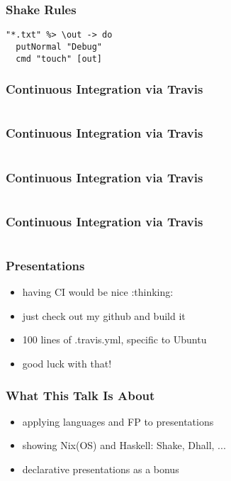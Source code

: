 \documentclass{beamer}
\begin{document}
\begin{frame}[fragile]
  \frametitle{Shake Rules}
  \begin{verbatim}
"*.txt" %> \out -> do
  putNormal "Debug"
  cmd "touch" [out]
  \end{verbatim}
\end{frame}

\begin{frame}
  \frametitle{Continuous Integration via Travis}
  \inputminted[linenos=false, fontsize=\tiny, lastline=31]{yaml}{static-source/long-travis-ci.yml}
\end{frame}

\begin{frame}
  \frametitle{Continuous Integration via Travis}
  \inputminted[linenos=false, fontsize=\tiny, firstline=31, lastline=60]{yaml}{static-source/long-travis-ci.yml}
\end{frame}

\begin{frame}
  \frametitle{Continuous Integration via Travis}
  \inputminted[linenos=false, fontsize=\tiny, firstline=61, lastline=90]{yaml}{static-source/long-travis-ci.yml}
\end{frame}

\begin{frame}
  \frametitle{Continuous Integration via Travis}
  \inputminted[linenos=false, fontsize=\tiny, firstline=91, lastline=120]{yaml}{static-source/long-travis-ci.yml}
\end{frame}

\begin{frame}
  \frametitle{Presentations}
  \begin{itemize}
  \item having CI would be nice :thinking:
  \item just check out my github and build it
  \item 100 lines of .travis.yml, specific to Ubuntu
  \item good luck with that!
  \end{itemize}
\end{frame}

\begin{frame}
  \frametitle{What This Talk Is About}
  \begin{itemize}
  \item applying languages and FP to presentations
  \item showing Nix(OS) and Haskell: Shake, Dhall, ...
  \item declarative presentations as a bonus
  \end{itemize}
\end{frame}
\end{document}
